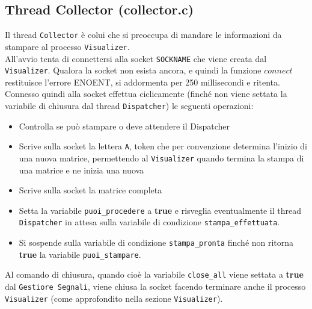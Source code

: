\documentclass[]{article}
\begin{document}
\subsection{Thread Collector (collector.c)}
Il thread \texttt{Collector} è colui che si preoccupa di mandare le informazioni da stampare al processo \texttt{Visualizer}.\\
All'avvio tenta di connettersi alla socket \texttt{SOCKNAME} che viene creata dal \texttt{Visualizer}. Qualora la socket non esista ancora, e quindi la funzione $connect$ restituisce l'errore ENOENT, si addormenta per 250 millisecondi e ritenta.\\
Connesso quindi alla socket effettua ciclicamente (finché non viene settata la variabile di chiusura dal thread \texttt{Dispatcher}) le seguenti operazioni:
\begin{itemize}
	\item Controlla se può stampare o deve attendere il Dispatcher
	\item Scrive sulla socket la lettera \texttt{A}, token che per convenzione determina l'inizio di una nuova matrice, permettendo al \texttt{Visualizer} quando termina la stampa di una matrice e ne inizia una nuova
	\item Scrive sulla socket la matrice completa
	\item Setta la variabile \texttt{puoi\_procedere} a \textbf{true} e risveglia eventualmente il thread \texttt{Dispatcher} in attesa sulla variabile di condizione \texttt{stampa\_effettuata}.
	\item Si sospende sulla variabile di condizione \texttt{stampa\_pronta} finché non ritorna \textbf{true} la variabile \texttt{puoi\_stampare}.
\end{itemize}

Al comando di chiusura, quando cioè la variabile \texttt{close\_all} viene settata a \textbf{true} dal \texttt{Gestiore Segnali}, viene chiusa la socket facendo terminare anche il processo \texttt{Visualizer} (come approfondito nella sezione \texttt{Visualizer}).
\end{document}
